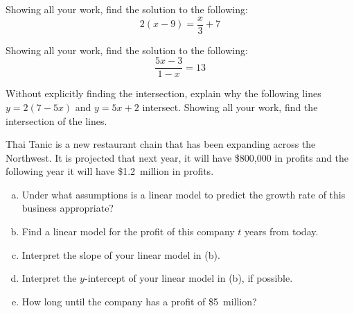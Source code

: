 \documentclass[12pt,letterpaper]{exam}
\begin{document}
\begin{questions}
\newpage
\question[10] Showing all your work, find the solution to the following:
	\[
	2(x - 9)= \frac{x}{3} + 7
	\] \pspace




\newpage
\question[10] Showing all your work, find the solution to the following:
	\[
	\dfrac{5x - 3}{1 - x}= 13
	\] \pspace




\newpage
\question[10] Without explicitly finding the intersection, explain why the following lines $y= 2(7 - 5x)$ and $y= 5x + 2$ intersect. Showing all your work, find the intersection of the lines. \pspace




\newpage
\question[10] Thai Tanic is a new restaurant chain that has been expanding across the Northwest. It is projected that next year, it will have \$800,000 in profits and the following year it will have \$1.2~million in profits. 
	\begin{enumerate}[(a)]
	\item Under what assumptions is a linear model to predict the growth rate of this business appropriate?
	\item Find a linear model for the profit of this company $t$ years from today. 
	\item Interpret the slope of your linear model in (b).
	\item Interpret the $y$-intercept of your linear model in (b), if possible. 
	\item How long until the company has a profit of \$5~million? 
	\end{enumerate}




\end{questions}
\end{document}
